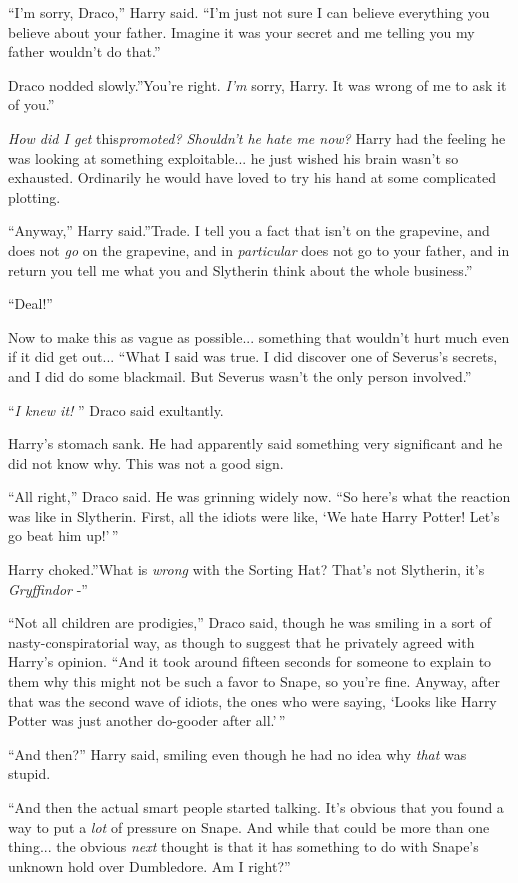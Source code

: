 ``I'm sorry, Draco,'' Harry said. ``I'm just not sure I can believe
everything you believe about your father. Imagine it was your secret and
me telling you my father wouldn't do that.''

Draco nodded slowly.''You're right. \emph{I'm} sorry, Harry. It was
wrong of me to ask it of you.''

\emph{How did I get} this\emph{promoted? Shouldn't he hate me now?}
Harry had the feeling he was looking at something exploitable... he
just wished his brain wasn't so exhausted. Ordinarily he would have
loved to try his hand at some complicated plotting.

``Anyway,'' Harry said.''Trade. I tell you a fact that isn't on the
grapevine, and does not \emph{go} on the grapevine, and in
\emph{particular} does not go to your father, and in return you tell me
what you and Slytherin think about the whole business.''

``Deal!''

Now to make this as vague as possible... something that wouldn't
hurt much even if it did get out... ``What I said was true. I did
discover one of Severus's secrets, and I did do some blackmail. But
Severus wasn't the only person involved.''

``\emph{I knew it!} '' Draco said exultantly.

Harry's stomach sank. He had apparently said something very significant
and he did not know why. This was not a good sign.

``All right,'' Draco said. He was grinning widely now. ``So here's what
the reaction was like in Slytherin. First, all the idiots were like, `We
hate Harry Potter! Let's go beat him up!'\,''

Harry choked.''What is \emph{wrong} with the Sorting Hat? That's not
Slytherin, it's \emph{Gryffindor} -''

``Not all children are prodigies,'' Draco said, though he was smiling in
a sort of nasty-conspiratorial way, as though to suggest that he
privately agreed with Harry's opinion. ``And it took around fifteen
seconds for someone to explain to them why this might not be such a
favor to Snape, so you're fine. Anyway, after that was the second wave
of idiots, the ones who were saying, `Looks like Harry Potter was just
another do-gooder after all.'\,''

``And then?'' Harry said, smiling even though he had no idea why
\emph{that} was stupid.

``And then the actual smart people started talking. It's obvious that you
found a way to put a \emph{lot} of pressure on Snape. And while that
could be more than one thing... the obvious \emph{next} thought is
that it has something to do with Snape's unknown hold over Dumbledore.
Am I right?''

